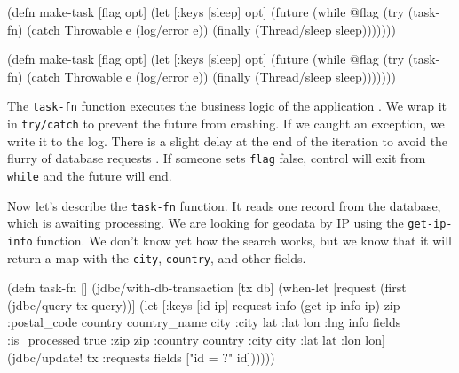 \ifnarrow

\begin{english}
  \begin{clojure/lines}
(defn make-task
  [flag opt]
  (let [{:keys [sleep]} opt]
    (future
      (while @flag
        (try
          (task-fn)
          (catch Throwable e
            (log/error e))
          (finally
            (Thread/sleep
              sleep)))))))
  \end{clojure/lines}
\end{english}

\else

\begin{english}
  \begin{clojure/lines}
(defn make-task
  [flag opt]
  (let [{:keys [sleep]} opt]
    (future
      (while @flag
        (try
          (task-fn)
          (catch Throwable e
            (log/error e))
          (finally
            (Thread/sleep sleep)))))))
  \end{clojure/lines}
\end{english}

\fi

The \verb|task-fn| function executes the business logic of the application . We wrap it in \verb|try/catch| to prevent the future from crashing. If we caught an exception, we write it to the log. There is a slight delay at the end of the iteration to avoid the flurry of database requests . If someone sets \verb|flag| false, control will exit from \verb|while| and the future will end.

Now let's describe the \verb|task-fn| function. It reads one record from the database, which is awaiting processing. We are looking for geodata by IP using the \verb|get-ip-info| function. We don't know yet how the search works, but we know that it will return a map with the \verb|city|, \verb|country|, and other fields.


\ifnarrow

\begin{english}
  \begin{clojure/lines}
(defn task-fn []
 (jdbc/with-db-transaction [tx db]
  (when-let [request
             (first
              (jdbc/query tx query))]
    (let [{:keys [id ip]} request
          info   (get-ip-info ip)
          {zip :postal_code
           country country_name
           city :city lat :lat
           lon :lng} info
          fields {:is_processed true
                  :zip zip
                  :country country
                  :city city
                  :lat lat
                  :lon lon}]
      (jdbc/update! tx :requests
        fields ["id = ?" id])))))
  \end{clojure/lines}
\end{english}


